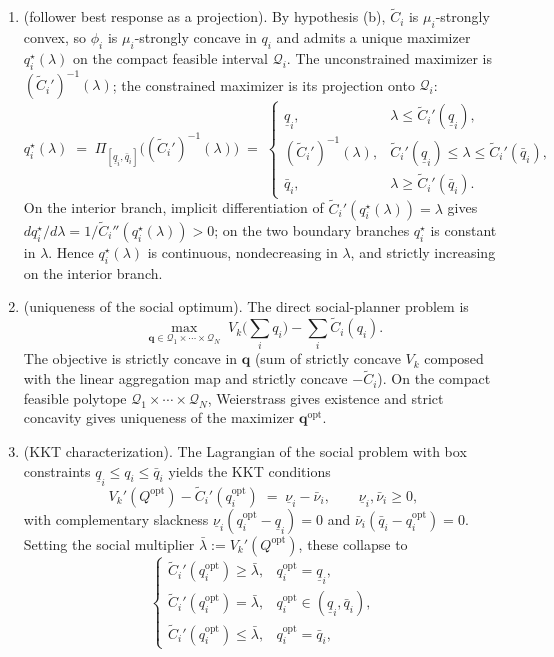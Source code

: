 \documentclass{article}
\begin{document}
\begin{enumerate}
    \item[Step 1] (follower best response as a projection). By hypothesis (b), $\widetilde C_i$ is $\mu_i$-strongly convex, so $\phi_i$ is $\mu_i$-strongly concave in $q_i$ and admits a unique maximizer $q_i^\star(\lambda)$ on the compact feasible interval $\mathcal{Q}_i$. The unconstrained maximizer is $(\widetilde C_i')^{-1}(\lambda)$; the constrained maximizer is its projection onto $\mathcal Q_i$:
$$q_i^\star(\lambda) \;=\; \Pi_{[\underline q_i, \bar q_i]}\!\big((\widetilde C_i')^{-1}(\lambda)\big) \;=\; \begin{cases} \underline q_i, & \lambda \le \widetilde C_i'(\underline q_i), \\ (\widetilde C_i')^{-1}(\lambda), & \widetilde C_i'(\underline q_i) \le \lambda \le \widetilde C_i'(\bar q_i), \\ \bar q_i, & \lambda \ge \widetilde C_i'(\bar q_i). \end{cases}$$
On the interior branch, implicit differentiation of $\widetilde C_i'(q_i^\star(\lambda)) = \lambda$ gives $d q_i^\star/d\lambda = 1/\widetilde C_i''(q_i^\star(\lambda)) > 0$; on the two boundary branches $q_i^\star$ is constant in $\lambda$. Hence $q_i^\star(\lambda)$ is continuous, nondecreasing in $\lambda$, and strictly increasing on the interior branch.
    \item[Step 2] (uniqueness of the social optimum). The direct social-planner problem is
$$\max_{\mathbf q \in \mathcal{Q}_1 \times \cdots \times \mathcal{Q}_N} \; V_k\!\Big(\textstyle\sum_i q_i\Big) - \sum_i \widetilde C_i(q_i).$$
The objective is strictly concave in $\mathbf q$ (sum of strictly concave $V_k$ composed with the linear aggregation map and strictly concave $-\widetilde C_i$). On the compact feasible polytope $\mathcal Q_1 \times \cdots \times \mathcal Q_N$, Weierstrass gives existence and strict concavity gives uniqueness of the maximizer $\mathbf q^{\mathrm{opt}}$.
    \item[Step 3] (KKT characterization). The Lagrangian of the social problem with box constraints $\underline q_i \le q_i \le \bar q_i$ yields the KKT conditions
$$V_k'(Q^{\mathrm{opt}}) - \widetilde C_i'(q_i^{\mathrm{opt}}) \;=\; \underline\nu_i - \bar\nu_i, \qquad \underline\nu_i, \bar\nu_i \ge 0,$$
with complementary slackness $\underline\nu_i (q_i^{\mathrm{opt}} - \underline q_i) = 0$ and $\bar\nu_i (\bar q_i - q_i^{\mathrm{opt}}) = 0$. Setting the social multiplier $\bar\lambda := V_k'(Q^{\mathrm{opt}})$, these collapse to
$$\begin{cases} \widetilde C_i'(q_i^{\mathrm{opt}}) \ge \bar\lambda, & q_i^{\mathrm{opt}} = \underline q_i, \\ \widetilde C_i'(q_i^{\mathrm{opt}}) = \bar\lambda, & q_i^{\mathrm{opt}} \in (\underline q_i, \bar q_i), \\ \widetilde C_i'(q_i^{\mathrm{opt}}) \le \bar\lambda, & q_i^{\mathrm{opt}} = \bar q_i, \end{cases}$$

\end{enumerate}
\end{document}
